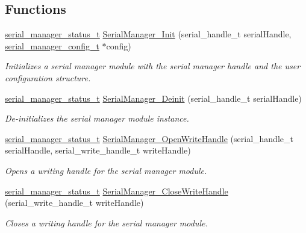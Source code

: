 \subsection*{Functions}
\begin{DoxyCompactItemize}
\item 
\mbox{\hyperlink{group__serialmanager_gac1d9f848c57ca245ad9da8d049369da9}{serial\+\_\+manager\+\_\+status\+\_\+t}} \mbox{\hyperlink{group__serialmanager_gaf8afb0df9a0bd264c5abb318cd8f2e44}{Serial\+Manager\+\_\+\+Init}} (serial\+\_\+handle\+\_\+t serial\+Handle, \mbox{\hyperlink{group__serialmanager_gaae9cb68d4f20901d9884b690d39a257a}{serial\+\_\+manager\+\_\+config\+\_\+t}} $\ast$config)
\begin{DoxyCompactList}\small\item\em Initializes a serial manager module with the serial manager handle and the user configuration structure. \end{DoxyCompactList}\item 
\mbox{\hyperlink{group__serialmanager_gac1d9f848c57ca245ad9da8d049369da9}{serial\+\_\+manager\+\_\+status\+\_\+t}} \mbox{\hyperlink{group__serialmanager_ga467c8a817003eacd48f86aaef1ce8306}{Serial\+Manager\+\_\+\+Deinit}} (serial\+\_\+handle\+\_\+t serial\+Handle)
\begin{DoxyCompactList}\small\item\em De-\/initializes the serial manager module instance. \end{DoxyCompactList}\item 
\mbox{\hyperlink{group__serialmanager_gac1d9f848c57ca245ad9da8d049369da9}{serial\+\_\+manager\+\_\+status\+\_\+t}} \mbox{\hyperlink{group__serialmanager_ga3d26249a8331e6ca17e9c60838b56d20}{Serial\+Manager\+\_\+\+Open\+Write\+Handle}} (serial\+\_\+handle\+\_\+t serial\+Handle, serial\+\_\+write\+\_\+handle\+\_\+t write\+Handle)
\begin{DoxyCompactList}\small\item\em Opens a writing handle for the serial manager module. \end{DoxyCompactList}\item 
\mbox{\hyperlink{group__serialmanager_gac1d9f848c57ca245ad9da8d049369da9}{serial\+\_\+manager\+\_\+status\+\_\+t}} \mbox{\hyperlink{group__serialmanager_gadb8df1d54da32e6de17680264ca4106a}{Serial\+Manager\+\_\+\+Close\+Write\+Handle}} (serial\+\_\+write\+\_\+handle\+\_\+t write\+Handle)
\begin{DoxyCompactList}\small\item\em Closes a writing handle for the serial manager module. \end{DoxyCompactList}\item 

\end{DoxyCompactItemize}
